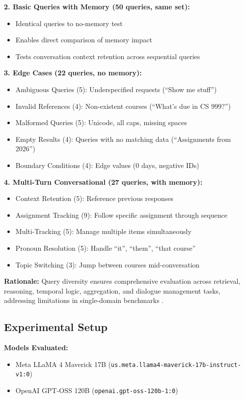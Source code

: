 \documentclass{article}
\begin{document}
\textbf{2. Basic Queries with Memory (50 queries, same set):}
\begin{itemize}
    \item Identical queries to no-memory test
    \item Enables direct comparison of memory impact
    \item Tests conversation context retention across sequential queries
\end{itemize}

\textbf{3. Edge Cases (22 queries, no memory):}
\begin{itemize}
    \item Ambiguous Queries (5): Underspecified requests (``Show me stuff'')
    \item Invalid References (4): Non-existent courses (``What's due in CS 999?'')
    \item Malformed Queries (5): Unicode, all caps, missing spaces
    \item Empty Results (4): Queries with no matching data (``Assignments from 2026'')
    \item Boundary Conditions (4): Edge values (0 days, negative IDs)
\end{itemize}

\textbf{4. Multi-Turn Conversational (27 queries, with memory):}
\begin{itemize}
    \item Context Retention (5): Reference previous responses
    \item Assignment Tracking (9): Follow specific assignment through sequence
    \item Multi-Tracking (5): Manage multiple items simultaneously  
    \item Pronoun Resolution (5): Handle ``it'', ``them'', ``that course''
    \item Topic Switching (3): Jump between courses mid-conversation
\end{itemize}

\textbf{Rationale:} Query diversity ensures comprehensive evaluation across retrieval, reasoning, temporal logic, aggregation, and dialogue management tasks, addressing limitations in single-domain benchmarks \cite{wang2025megaagent}.

\subsection{Experimental Setup}

\textbf{Models Evaluated:}
\begin{itemize}
    \item Meta LLaMA 4 Maverick 17B (\texttt{us.meta.llama4-maverick-17b-instruct-v1:0})
    \item OpenAI GPT-OSS 120B (\texttt{openai.gpt-oss-120b-1:0})
\end{itemize}
\end{document}

